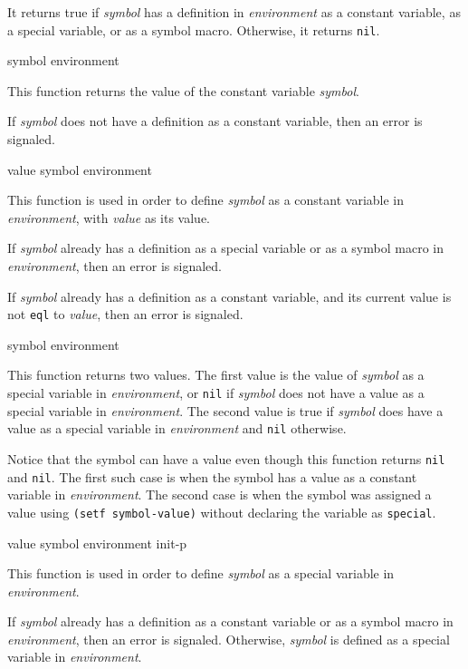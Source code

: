 It returns true if \textit{symbol} has a definition in
\textit{environment} as a constant variable, as a special variable, or
as a symbol macro.  Otherwise, it returns \texttt{nil}.

 {symbol environment}

This function returns the value of the constant variable
\textit{symbol}.

If \textit{symbol} does not have a definition as a constant variable,
then an error is signaled.

 {value symbol environment}

This function is used in order to define \textit{symbol} as a constant
variable in \textit{environment}, with \textit{value} as its value.

If \textit{symbol} already has a definition as a special variable or
as a symbol macro in \textit{environment}, then an error is signaled.

If \textit{symbol} already has a definition as a constant variable,
and its current value is not \texttt{eql} to \textit{value}, then an
error is signaled.

 {symbol environment}

This function returns two values.  The first value is the value of
\textit{symbol} as a special variable in \textit{environment}, or
\texttt{nil} if \textit{symbol} does not have a value as a special
variable in \textit{environment}.  The second value is true if
\textit{symbol} does have a value as a special variable in
\textit{environment} and \texttt{nil} otherwise.

Notice that the symbol can have a value even though this function
returns \texttt{nil} and \texttt{nil}.  The first such case is when
the symbol has a value as a constant variable in \textit{environment}.
The second case is when the symbol was assigned a value using
\texttt{(setf symbol-value)} without declaring the variable as
\texttt{special}.

 {value symbol environment init-p}

This function is used in order to define \textit{symbol} as a special
variable in \textit{environment}.

If \textit{symbol} already has a definition as a constant variable or
as a symbol macro in \textit{environment}, then an error is signaled.
Otherwise, \textit{symbol} is defined as a special variable in
\textit{environment}.


